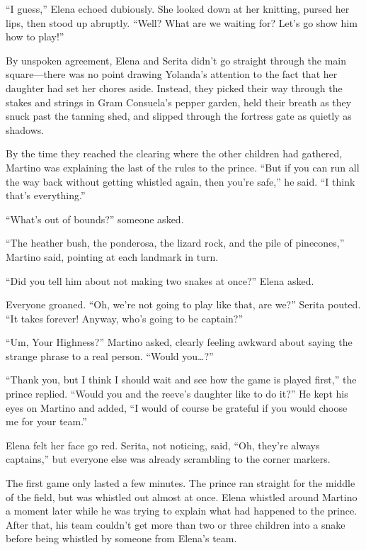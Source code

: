 \documentclass[10pt]{book}
\begin{document}
``I guess,'' Elena echoed dubiously. She looked down at her knitting, pursed her lips, then stood up abruptly. ``Well? What are we waiting for? Let's go show him how to play!''

By unspoken agreement, Elena and Serita didn't go straight through the main square---there was no point drawing Yolanda's attention to the fact that her daughter had set her chores aside. Instead, they picked their way through the stakes and strings in Gram Consuela's pepper garden, held their breath as they snuck past the tanning shed, and slipped through the fortress gate as quietly as shadows.

By the time they reached the clearing where the other children had gathered, Martino was explaining the last of the rules to the prince.  ``But if you can run all the way back without getting whistled again, then you're safe,'' he said. ``I think that's everything.''

``What's out of bounds?'' someone asked.

``The heather bush, the ponderosa, the lizard rock, and the pile of pinecones,'' Martino said, pointing at each landmark in turn.

``Did you tell him about not making two snakes at once?'' Elena asked.

Everyone groaned. ``Oh, we're not going to play like that, are we?'' Serita pouted. ``It takes forever! Anyway, who's going to be captain?''

``Um, Your Highness?'' Martino asked, clearly feeling awkward about saying the strange phrase to a real person. ``Would you{\ldots}?''

``Thank you, but I think I should wait and see how the game is played first,'' the prince replied. ``Would you and the reeve's daughter like to do it?'' He kept his eyes on Martino and added, ``I would of course be grateful if you would choose me for your team.''

Elena felt her face go red. Serita, not noticing, said, ``Oh, they're always captains,'' but everyone else was already scrambling to the corner markers.

The first game only lasted a few minutes. The prince ran straight for the middle of the field, but was whistled out almost at once. Elena whistled around Martino a moment later while he was trying to explain what had happened to the prince. After that, his team couldn't get more than two or three children into a snake before being whistled by someone from Elena's team.
\end{document}
